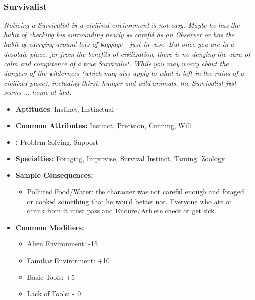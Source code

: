 	\subsubsection{Survivalist}\label{Survivalist}
		\textit{Noticing a Survivalist in a civilized environment is not easy.
		Maybe he has the habit of checking his surrounding nearly as careful as an Observer or has the habit of carrying around lots of baggage - just in case.
		But once you are in a desolate place, far from the benefits of civilization, there is no denying the aura of calm and competence of a true Survivalist.
		While you may worry about the dangers of the wilderness (which may also apply to what is left in the ruins of a civilized place), including thirst, hunger and wild animals, the Survivalist just seems ... home at last.}
		\begin{itemize}
			\item \textbf{Aptitudes:} Instinct, Instinctual
			\item \textbf{Common Attributes:} Instinct, Precision, Cunning, Will
			\item \textbf{:} Problem Solving, Support
			\item \textbf{Specialties:} Foraging, Improvise, Survival Instinct, Taming, Zoology
			\item \textbf{Sample Consequences:} 
			\begin{itemize}
				\item Polluted Food/Water: the character was not careful enough and foraged or cooked something that he would better not. Everyone who ate or drank from it must pass and Endure/Athlete check or get sick.
			\end{itemize}
			\item \textbf{Common Modifiers:}
			\begin{itemize}
				\item Alien Environment: -15
				\item Familiar Environment: +10
				\item Basic Tools: +5
				\item Lack of Tools: -10
			\end{itemize}
		\end{itemize}

